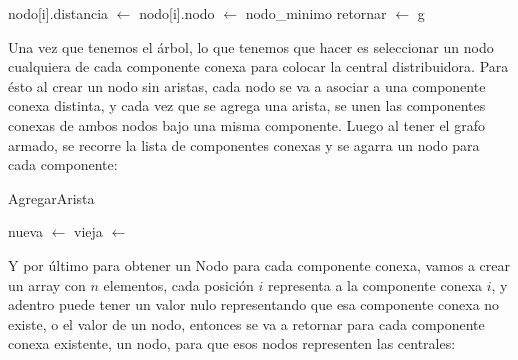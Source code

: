 \begin{algorithmic}[1]
						\State nodo[i].distancia $\gets$ \Call{Distancia}{ciudades[i], ciudades[nodo\_minimo}
						\State nodo[i].nodo $\gets$ nodo\_minimo
					\EndIf
				\EndIf
			\EndFor \label{ej_2:pseudo:fin_actualiza}
		\EndFor \label{ej_2:pseudo:fin_crea_arbol}
		\Statex
		\State {}  \label{ej_2:pseudo:sort}
		\Statex
		 \label{ej_2:pseudo:componentes}
		\State {} 
		\EndFor \label{ej_2:pseudo:fin_componentes}
		\State retornar $\gets$ g
	\EndProcedure
\end{algorithmic}

Una vez que tenemos el \'arbol, lo que tenemos que hacer es seleccionar un nodo cualquiera de cada componente conexa para colocar la central distribuidora. Para \'esto al crear un nodo sin aristas, cada nodo se va a asociar a una componente conexa distinta, y cada vez que se agrega una arista, se unen las componentes conexas de ambos nodos bajo una misma componente. Luego al tener el grafo armado, se recorre la lista de componentes conexas y se agarra un nodo para cada componente:

\begin{algorithm}[!h]
\caption{AgregarArista} \label{ej_2:pseudo_agregar_arista}
\end{algorithm}
\begin{algorithmic}[1]
		\State {} 
			\State nueva $\gets$ 
			\State vieja $\gets$ 
			 
					\State {}
				\EndIf
			\EndFor
		\EndIf
	\EndProcedure
\end{algorithmic}

Y por \'ultimo para obtener un Nodo para cada componente conexa, vamos a crear un array con $n$ elementos, cada posici\'on $i$ representa a la componente conexa $i$, y adentro puede tener un valor nulo representando que esa componente conexa no existe, o el valor de un nodo, entonces se va a retornar para cada componente conexa existente, un nodo, para que esos nodos representen las centrales:

